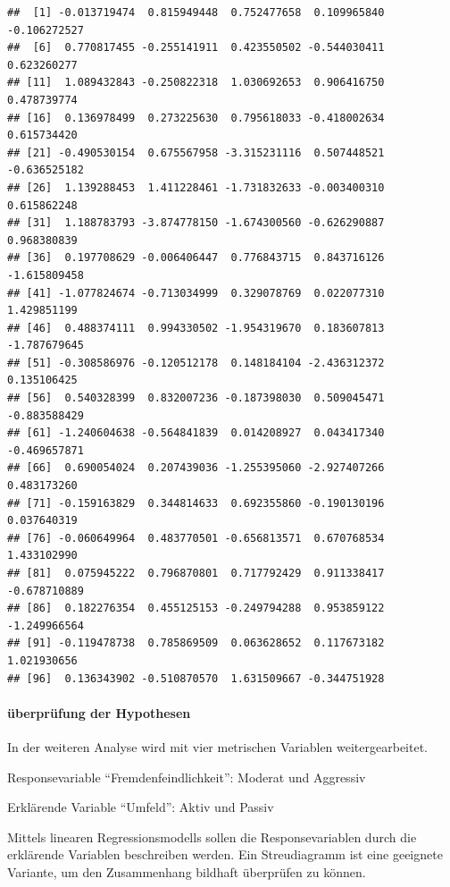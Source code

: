 \documentclass[]{article}
\newenvironment{Shaded}{\begin{snugshade}}{\end{snugshade}}
\newcommand{\NormalTok}[1]{{#1}}
\let\oldparagraph\paragraph
\renewcommand{\paragraph}[1]{\oldparagraph{#1}\mbox{}}
\begin{document}
\begin{Shaded}
\end{Shaded}

\begin{verbatim}
##  [1] -0.013719474  0.815949448  0.752477658  0.109965840 -0.106272527
##  [6]  0.770817455 -0.255141911  0.423550502 -0.544030411  0.623260277
## [11]  1.089432843 -0.250822318  1.030692653  0.906416750  0.478739774
## [16]  0.136978499  0.273225630  0.795618033 -0.418002634  0.615734420
## [21] -0.490530154  0.675567958 -3.315231116  0.507448521 -0.636525182
## [26]  1.139288453  1.411228461 -1.731832633 -0.003400310  0.615862248
## [31]  1.188783793 -3.874778150 -1.674300560 -0.626290887  0.968380839
## [36]  0.197708629 -0.006406447  0.776843715  0.843716126 -1.615809458
## [41] -1.077824674 -0.713034999  0.329078769  0.022077310  1.429851199
## [46]  0.488374111  0.994330502 -1.954319670  0.183607813 -1.787679645
## [51] -0.308586976 -0.120512178  0.148184104 -2.436312372  0.135106425
## [56]  0.540328399  0.832007236 -0.187398030  0.509045471 -0.883588429
## [61] -1.240604638 -0.564841839  0.014208927  0.043417340 -0.469657871
## [66]  0.690054024  0.207439036 -1.255395060 -2.927407266  0.483173260
## [71] -0.159163829  0.344814633  0.692355860 -0.190130196  0.037640319
## [76] -0.060649964  0.483770501 -0.656813571  0.670768534  1.433102990
## [81]  0.075945222  0.796870801  0.717792429  0.911338417 -0.678710889
## [86]  0.182276354  0.455125153 -0.249794288  0.953859122 -1.249966564
## [91] -0.119478738  0.785869509  0.063628652  0.117673182  1.021930656
## [96]  0.136343902 -0.510870570  1.631509667 -0.344751928
\end{verbatim}

\paragraph{überprüfung der Hypothesen}\label{uberprufung-der-hypothesen}

In der weiteren Analyse wird mit vier metrischen Variablen
weitergearbeitet.

Responsevariable ``Fremdenfeindlichkeit'': Moderat und Aggressiv

Erklärende Variable ``Umfeld'': Aktiv und Passiv

Mittels linearen Regressionsmodells sollen die Responsevariablen durch
die erklärende Variablen beschreiben werden. Ein Streudiagramm ist eine
geeignete Variante, um den Zusammenhang bildhaft überprüfen zu können.
\end{document}
